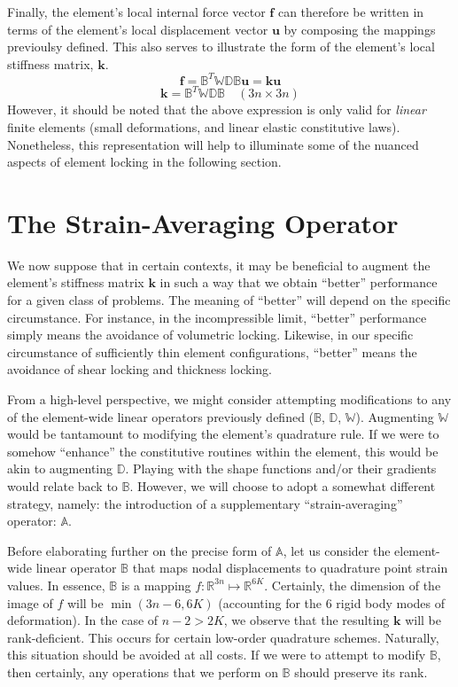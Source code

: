 \documentclass[11pt]{article} %
\begin{document}
Finally, the element's local internal force vector $\mathbf{f}$ can therefore be written in terms of the element's local displacement vector $\mathbf{u}$ by composing the mappings previoulsy defined. This also serves to illustrate the form of the element's local stiffness matrix, $\mathbf{k}$.
\begin{equation}
	\mathbf{f} = \mathbb{B}^T \mathbb{W} \mathbb{D} \mathbb{B} \mathbf{u} = \mathbf{k} \mathbf{u}
\end{equation}
\begin{equation}
	\mathbf{k} = \mathbb{B}^T \mathbb{W} \mathbb{D} \mathbb{B} \quad (3n \times 3n)
\end{equation}
However, it should be noted that the above expression is only valid for \textit{linear} finite elements (small deformations, and linear elastic constitutive laws). Nonetheless, this representation will help to illuminate some of the nuanced aspects of element locking in the following section.

\section{The Strain-Averaging Operator}

We now suppose that in certain contexts, it may be beneficial to augment the element's stiffness matrix $\mathbf{k}$ in such a way that we obtain ``better'' performance for a given class of problems. The meaning of ``better'' will depend on the specific circumstance. For instance, in the incompressible limit, ``better'' performance simply means the avoidance of volumetric locking. Likewise, in our specific circumstance of sufficiently thin element configurations, ``better'' means the avoidance of shear locking and thickness locking.

From a high-level perspective, we might consider attempting modifications to any of the element-wide linear operators previously defined ($\mathbb{B}$, $\mathbb{D}$, $\mathbb{W}$). Augmenting $\mathbb{W}$ would be tantamount to modifying the element's quadrature rule. If we were to somehow ``enhance'' the constitutive routines within the element, this would be akin to augmenting $\mathbb{D}$. Playing with the shape functions and/or their gradients would relate back to $\mathbb{B}$. However, we will choose to adopt a somewhat different strategy, namely: the introduction of a supplementary ``strain-averaging'' operator: $\mathbb{A}$.

Before elaborating further on the precise form of $\mathbb{A}$, let us consider the element-wide linear operator $\mathbb{B}$ that maps nodal displacements to quadrature point strain values. In essence, $\mathbb{B}$ is a mapping $f \colon \mathbb{R}^{3n} \mapsto \mathbb{R}^{6K}$. Certainly, the dimension of the image of $f$ will be $\min (3n-6, 6K)$ (accounting for the 6 rigid body modes of deformation). In the case of $n - 2 > 2K$, we observe that the resulting $\mathbf{k}$ will be rank-deficient. This occurs for certain low-order quadrature schemes. Naturally, this situation should be avoided at all costs. If we were to attempt to modify $\mathbb{B}$, then certainly, any operations that we perform on $\mathbb{B}$ should preserve its rank.
\end{document}
